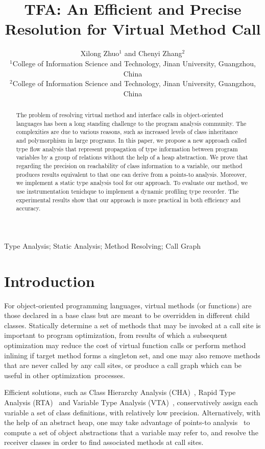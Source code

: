 \documentclass{fac}
\title{TFA: An Efficient and Precise Resolution for
		Virtual Method Call}
\author[Xilong Zhuo and Chenyi Zhang]
    {Xilong Zhuo$^1$ and Chenyi Zhang$^2$\\
     $^1$College of Information Science and Technology, Jinan University, Guangzhou, China\\
     $^2$College of Information Science and Technology, Jinan University, Guangzhou, China}
\begin{document}
\label{firstpage}

\makecorrespond

\maketitle

\begin{abstract}
The problem of resolving virtual method and interface calls in object-oriented languages has been a long standing challenge to the program analysis community. The complexities are due to various reasons, such as increased levels of class inheritance and polymorphism in large programs. In this paper, we propose a new approach called type flow analysis that represent propagation of type information between program variables by a group of relations without the help of a heap abstraction. We prove that regarding the precision on reachability of class information to a variable, our method produces results equivalent to that one can derive from a points-to analysis.
Moreover, we implement a static type analysis tool for our approach. To evaluate our method, we use instrumentation tenichque to implement a dynamic profiling type recorder. The experimental results show that our approach is more practical in both efficiency and accuracy.
\end{abstract}

\begin{keywords}
Type Analysis; Static Analysis; Method Resolving; Call Graph
\end{keywords}

\section{Introduction}\label{sec:introduction}
For object-oriented programming languages, virtual methods (or functions) are those declared in a base class but are meant to be overridden in different child classes. Statically determine a set of methods that may be invoked at a call site is important to program optimization, from results of which a subsequent optimization may reduce the cost of virtual function calls or perform method inlining if target method forms a singleton set, and one may also remove methods that are never called by any call sites, or produce a call graph which can be useful in other optimization~processes.

Efficient solutions, such as Class Hierarchy Analysis (CHA)~\cite{Dean1995,Fernandez1995}, Rapid Type Analysis (RTA)~\cite{Bacon1996} and Variable Type Analysis (VTA)~\cite{Sundaresan2000}, conservatively assign each variable a set of class definitions, with relatively low precision. Alternatively, with the help of an abstract heap, one may take advantage of points-to analysis~\cite{andersen94} to compute a set of object abstractions that a variable may refer to, and resolve the receiver classes in order to find associated methods at call sites.
\end{document}
